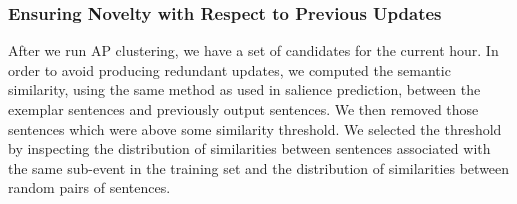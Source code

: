 \subsubsection{Ensuring Novelty with Respect to Previous Updates}
\label{sec:novelty}
After we run AP clustering, we have a set of candidates for the current hour.  In order to avoid
producing
redundant updates, we computed the semantic similarity,
using the same method as used in salience prediction,
between the exemplar sentences and previously output sentences.  We then removed those sentences which were above some similarity threshold.  We selected the threshold by inspecting the distribution of similarities between sentences associated with the same sub-event in the training set and the distribution of similarities between random pairs of sentences.  

%

